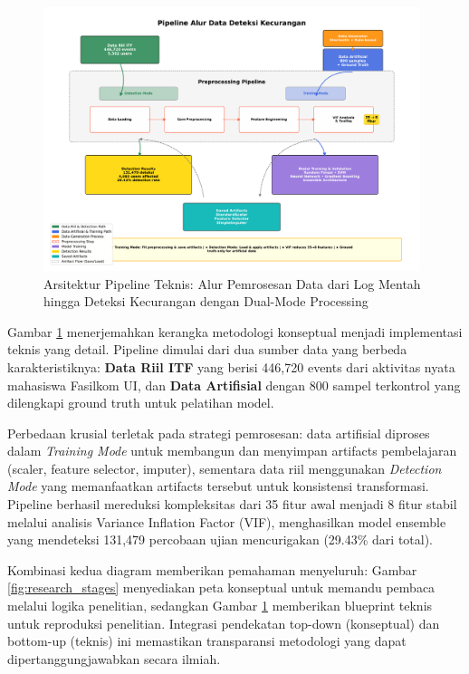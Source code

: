 \begin{figure}[htbp]
    \centering
    \includegraphics[width=0.98\textwidth]{newfigures/technical_pipeline_flow_final.pdf}
    \caption{Arsitektur Pipeline Teknis: Alur Pemrosesan Data dari Log Mentah hingga Deteksi Kecurangan dengan Dual-Mode Processing}
    \label{fig:technical_pipeline}
\end{figure}

Gambar \ref{fig:technical_pipeline} menerjemahkan kerangka metodologi konseptual menjadi implementasi teknis yang detail. Pipeline dimulai dari dua sumber data yang berbeda karakteristiknya: \textbf{Data Riil ITF} yang berisi 446,720 events dari aktivitas nyata mahasiswa Fasilkom UI, dan \textbf{Data Artifisial} dengan 800 sampel terkontrol yang dilengkapi ground truth untuk pelatihan model. 

Perbedaan krusial terletak pada strategi pemrosesan: data artifisial diproses dalam \textit{Training Mode} untuk membangun dan menyimpan artifacts pembelajaran (scaler, feature selector, imputer), sementara data riil menggunakan \textit{Detection Mode} yang memanfaatkan artifacts tersebut untuk konsistensi transformasi. Pipeline berhasil mereduksi kompleksitas dari 35 fitur awal menjadi 8 fitur stabil melalui analisis Variance Inflation Factor (VIF), menghasilkan model ensemble yang mendeteksi 131,479 percobaan ujian mencurigakan (29.43\% dari total).

Kombinasi kedua diagram memberikan pemahaman menyeluruh: Gambar \ref{fig:research_stages} menyediakan peta konseptual untuk memandu pembaca melalui logika penelitian, sedangkan Gambar \ref{fig:technical_pipeline} memberikan blueprint teknis untuk reproduksi penelitian. Integrasi pendekatan top-down (konseptual) dan bottom-up (teknis) ini memastikan transparansi metodologi yang dapat dipertanggungjawabkan secara ilmiah.

